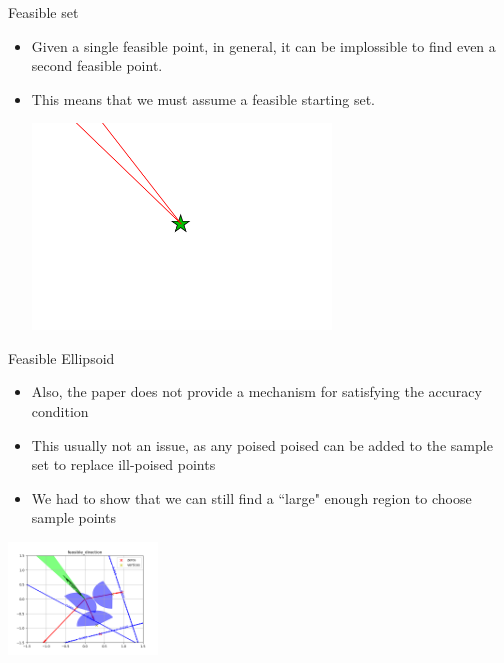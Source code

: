 \documentclass{beamer}
\begin{document}
\begin{frame}{Feasible set}
\begin{itemize}
	\item Given a single feasible point, in general, it can be implossible to find even a second feasible point.
	\item This means that we must assume a feasible starting set.
	\begin{center}
		\includegraphics[width=300px]{images/only_one_feasible_point.png}
	\end{center}
\end{itemize}
\end{frame}




\begin{frame}{Feasible Ellipsoid}
	\begin{itemize}
		\item Also, the paper does not provide a mechanism for satisfying the accuracy condition
		\item This usually not an issue, as any poised poised can be added to the sample set to replace ill-poised points
		\item We had to show that we can still find a ``large" enough region to choose sample points
	\end{itemize}
	\begin{center}
		\includegraphics[width=150px]{images/feasible_direction.png}
	\end{center}
\end{frame}
\end{document}
